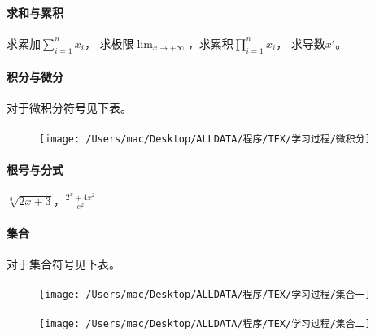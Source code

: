 \documentclass[UTF8]{ctexart}
\begin{document}
 \paragraph{求和与累积} 求累加$\displaystyle\sum_{i = 1}^{n}x_i$，
求极限$\displaystyle\lim_{x \to +\infty}$，求累积$\displaystyle\prod_{i=1}^n x_i$，
求导数$x\prime$。



\paragraph{积分与微分} 对于微积分符号见下表。

\begin{figure}[htbp]
 \centering
 \paragraph{} \texttt{[image: /Users/mac/Desktop/ALLDATA/程序/TEX/学习过程/微积分]}\label{fig:figure3}
\end{figure}

\paragraph{根号与分式} $\sqrt[3]{2x+3}$，$\frac {2^{x}+4x^{2}}{e^{2}}$

 \paragraph{集合} 对于集合符号见下表。

\begin{figure}[htbp]
 \centering
 \paragraph{} \texttt{[image: /Users/mac/Desktop/ALLDATA/程序/TEX/学习过程/集合一]}\label{fig:figure4}
 \paragraph{} \texttt{[image: /Users/mac/Desktop/ALLDATA/程序/TEX/学习过程/集合二]}\label{fig:figure5}
\end{figure}
\end{document}
